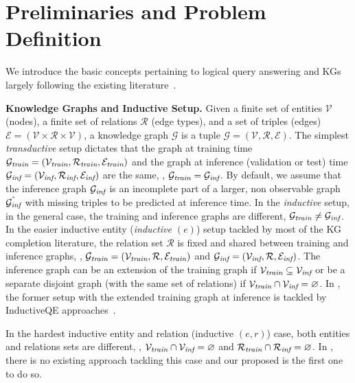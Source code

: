 \section{Preliminaries and Problem Definition}
\label{sec:prelim}

We introduce the basic concepts pertaining to logical query answering and KGs largely following the 
existing literature~\citep{galkin2022,ren2023ngdb,ultra}.%

\textbf{Knowledge Graphs and Inductive Setup.}
Given a finite set of entities $\mathcal{V}$ (nodes), a finite set of relations $\mathcal{R}$ (edge types), and a set of triples (edges) $\mathcal{E} = (\mathcal{V} \times \mathcal{R} \times \mathcal{V})$, a knowledge graph $\mathcal{G}$ is a tuple $\mathcal{G} = (\mathcal{V}, \mathcal{R}, \mathcal{E})$.
The simplest \emph{transductive} setup dictates that the graph at training time $\mathcal{G}_{\textit{train}} = (\mathcal{V}_{\textit{train}}, \mathcal{R}_{\textit{train}}, \mathcal{E}_{\textit{train}})$ and the graph at inference (validation or test) time $\mathcal{G}_{\textit{inf}} = (\mathcal{V}_{\textit{inf}}, \mathcal{R}_{\textit{inf}}, \mathcal{E}_{\textit{inf}})$ are the same, \ie, $\mathcal{G}_{\textit{train}} = \mathcal{G}_{\textit{inf}}$. 
By default, we assume that the inference graph $\mathcal{G}_{\textit{inf}}$ is an incomplete part of a larger, non observable graph $\hat{\mathcal{G}_{\textit{inf}}}$ with missing triples to be predicted at inference time.
In the \emph{inductive} setup, in the general case, the training and inference graphs are different, $\mathcal{G}_{\textit{train}} \neq \mathcal{G}_{\textit{inf}}$.
In the easier inductive entity (\emph{inductive $(e)$}) setup tackled by most of the KG completion literature, the relation set $\mathcal{R}$ is fixed and shared between training and inference graphs, \ie, $\mathcal{G}_{\textit{train}} = (\mathcal{V}_{\textit{train}}, \mathcal{R}, \mathcal{E}_{\textit{train}})$ and $\mathcal{G}_{\textit{inf}} = (\mathcal{V}_{\textit{inf}}, \mathcal{R}, \mathcal{E}_{\textit{inf}})$. The inference graph can be an extension of the training graph if $\mathcal{V}_{\textit{train}} \subseteq \mathcal{V}_{\textit{inf}}$ or be a separate disjoint graph (with the same set of relations) if $\mathcal{V}_{\textit{train}} \cap \mathcal{V}_{\textit{inf}} = \varnothing$. 
In \clqa, the former setup with the extended training graph at inference is tackled by InductiveQE approaches~\citep{galkin2022}. 

In the hardest inductive entity and relation (inductive $(e,r)$) case, both entities and relations sets are different, \ie, $\mathcal{V}_{\textit{train}} \cap \mathcal{V}_{\textit{inf}} = \varnothing$ and $\mathcal{R}_{\textit{train}} \cap \mathcal{R}_{\textit{inf}} = \varnothing$. 
In \clqa, there is no existing approach tackling this case and our proposed \method is the first one to do so.



